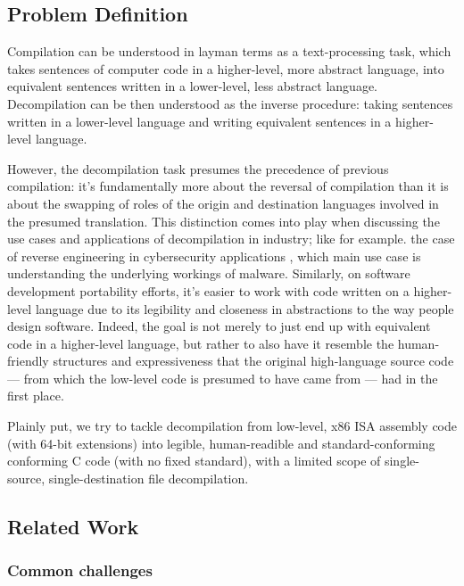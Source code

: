 \documentclass[../main.tex]{subfiles}
\begin{document}
\subsection{Problem Definition}

Compilation can be understood in layman terms as a text-processing task, which 
takes sentences of computer code in a higher-level, more abstract language, into
equivalent sentences written in a lower-level, less abstract language. Decompilation
can be then understood as the inverse procedure: taking sentences written in a
lower-level language and writing equivalent sentences in a higher-level language.

However, the decompilation task presumes the precedence of previous compilation: 
it's fundamentally more about the reversal of compilation than it is about
the swapping of roles of the origin and destination languages involved in the
presumed translation. This distinction comes into play when discussing the use
cases and applications of decompilation in industry; like for example. the case
of reverse engineering in cybersecurity applications \cite{lin_reverse_2010} \cite{durfina_design_2011}, which
main use case is understanding the underlying workings of malware. Similarly, on
software development portability efforts, it's easier to work with code written
on a higher-level language due to its legibility and closeness in abstractions to
the way people design software. 
Indeed, the goal is not merely to just end up with equivalent code in a higher-level
language, but rather to also have it resemble the human-friendly structures and
expressiveness that the original high-language source code — from which the low-level
code is presumed to have came from — had in the first place.

Plainly put, we try to tackle decompilation from low-level, x86 ISA assembly code (with
64-bit extensions) into legible, human-readible and standard-conforming conforming C
code (with no fixed standard), with a limited scope of single-source, single-destination
file decompilation. 

\subsection{Related Work}

\subsubsection{Common challenges}
\end{document}

